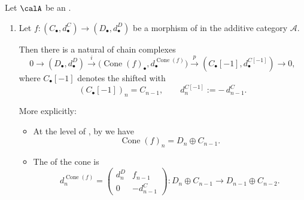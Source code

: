 \begin{lemma} \label{lemma:mapping_cone_of_a_map_of_chain_cochain_complexes_in_an_additive_category_fits_into_a_split_exact_sequence}
    Let $\calA$ be an .
    \begin{enumerate}
        \item 
        Let $f : (C_\bullet, d^C_\bullet) \to (D_\bullet, d^D_\bullet)$ be a morphism of
         in the additive category $\mathcal{A}$.

        Then there is a natural  of chain complexes
        \[
        0 \longrightarrow (D_\bullet, d^D_\bullet)
        \xrightarrow{i}
        \bigl(\operatorname{Cone}(f)_\bullet, d^{\operatorname{Cone}(f)}_\bullet\bigr)
        \xrightarrow{p}
        (C_\bullet[-1], d^{C[-1]}_\bullet)
        \longrightarrow 0,
        \]
        where $C_\bullet[-1]$ denotes the shifted  with
        \[
        (C_\bullet[-1])_n = C_{n-1}, \qquad
        d^{C[-1]}_n := -\,d^C_{n-1}.
        \]

        More explicitly:

        \begin{itemize}
        \item At the level of , by  we have
        \[
            \operatorname{Cone}(f)_n = D_n \oplus C_{n-1}.
        \]

        \item The  of the cone is
        \[
            d^{\operatorname{Cone}(f)}_n
            =
            \begin{pmatrix}
            d^D_n & f_{n-1} \\
            0     & -d^C_{n-1}
            \end{pmatrix}
            :
            D_n \oplus C_{n-1} \longrightarrow D_{n-1} \oplus C_{n-2}.
        \]


\end{itemize}
\end{enumerate}
\end{lemma}

